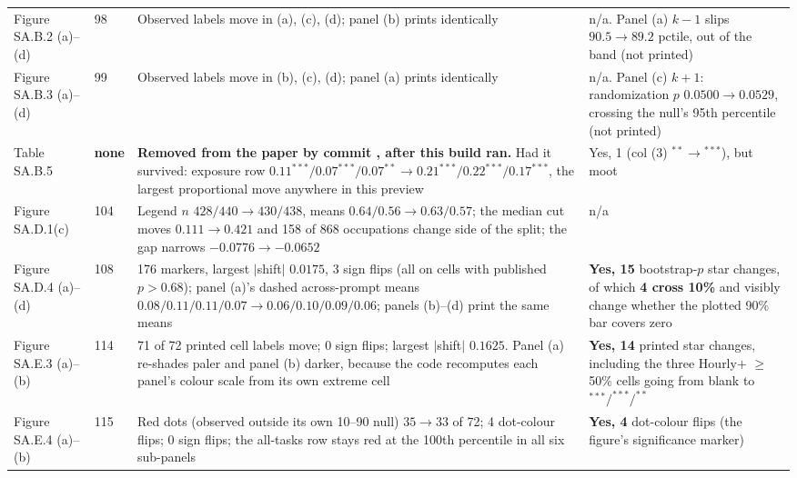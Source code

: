 \documentclass[10pt]{article}
\newcommand{\file}[1]{{\ttfamily\detokenize{#1}}}
\newcommand{\ra}{\ensuremath{\rightarrow}}
\begin{document}
{\begin{longtable}{@{}p{3.4cm}p{1.5cm}p{11.2cm}p{5.2cm}@{}}
\addlinespace
Figure SA.B.2 (a)--(d) & 98 &
Observed labels move in (a), (c), (d); panel (b) prints identically &
n/a. Panel (a) $k{-}1$ slips $90.5 \ra 89.2$ pctile, out of the band (not printed) \\
\addlinespace
Figure SA.B.3 (a)--(d) & 99 &
Observed labels move in (b), (c), (d); panel (a) prints identically &
n/a. \textcolor{warncol}{Panel (c) $k{+}1$: randomization $p$ $0.0500 \ra 0.0529$}, crossing the null's
95th percentile (not printed) \\
\addlinespace
Table SA.B.5 &
\textcolor{warncol}{\bfseries none} &
\textcolor{warncol}{\bfseries Removed from the paper by commit \file{1d64cb0}, after this build ran.}
Had it survived: exposure row $0.11^{***}/0.07^{***}/0.07^{**} \ra 0.21^{***}/0.22^{***}/0.17^{***}$,
the largest proportional move anywhere in this preview &
Yes, 1 (col (3) $^{**}\ra{}^{***}$), but moot \\
\addlinespace
Figure SA.D.1(c) & 104 &
Legend $n$ $428/440 \ra 430/438$, means $0.64/0.56 \ra 0.63/0.57$; the median cut moves
$0.111 \ra 0.421$ and 158 of 868 occupations change side of the split; the gap narrows
$-0.0776 \ra -0.0652$ &
n/a \\
\addlinespace
Figure SA.D.4 (a)--(d) & 108 &
176 markers, largest $|$shift$|$ $0.0175$, 3 sign flips (all on cells with published $p>0.68$);
panel (a)'s dashed across-prompt means $0.08/0.11/0.11/0.07 \ra 0.06/0.10/0.09/0.06$;
panels (b)--(d) print the same means &
\textcolor{warncol}{\bfseries Yes, 15} bootstrap-$p$ star changes, of which \textbf{4 cross 10\%}
and visibly change whether the plotted 90\% bar covers zero \\
\addlinespace
Figure SA.E.3 (a)--(b) & 114 &
71 of 72 printed cell labels move; 0 sign flips; largest $|$shift$|$ $0.1625$. Panel (a) re-shades
paler and panel (b) darker, because the code recomputes each panel's colour scale from its own extreme cell &
\textcolor{warncol}{\bfseries Yes, 14} printed star changes, including the three
Hourly$+$ $\geq$50\% cells going from blank to $^{***}/^{***}/^{**}$ \\
\addlinespace
Figure SA.E.4 (a)--(b) & 115 &
Red dots (observed outside its own 10--90 null) $35 \ra 33$ of 72; 4 dot-colour flips; 0 sign flips;
the all-tasks row stays red at the 100th percentile in all six sub-panels &
\textcolor{warncol}{\bfseries Yes, 4} dot-colour flips (the figure's significance marker) \\
\bottomrule
\end{longtable}
}
\end{document}
